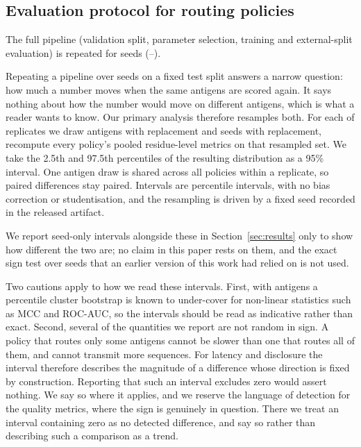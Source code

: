 \subsection{Evaluation protocol for routing policies}
\label{sec:eval-protocol}

The full pipeline (validation split, parameter selection, training and
external-split evaluation) is repeated for \NumSeeds{} seeds
(\SeedFirst{}--\SeedLast{}).

Repeating a pipeline over seeds on a fixed test split answers a narrow
question: how much a number moves when the same antigens are scored again. It
says nothing about how the number would move on different antigens, which is
what a reader wants to know. Our primary analysis therefore resamples both.
For each of \AntigenBootstrapRepeats{} replicates we draw \AntigenCount{}
antigens with replacement and \NumSeeds{} seeds with replacement, recompute
every policy's pooled residue-level metrics on that resampled set. We take
the 2.5th and 97.5th percentiles of the resulting distribution as a 95\%
interval. One antigen draw is shared across all policies within a replicate,
so paired differences stay paired. Intervals are percentile intervals, with no
bias correction or studentisation, and the resampling is driven by a fixed
seed recorded in the released artifact.

We report seed-only intervals alongside these in Section~\ref{sec:results}
only to show how different the two are; no claim in this paper rests on them,
and the exact sign test over seeds that an earlier version of this work had relied
on is not used.

Two cautions apply to how we read these intervals. First, with
\AntigenCount{} antigens a percentile cluster bootstrap is known to
under-cover for non-linear statistics such as MCC and ROC-AUC, so the
intervals should be read as indicative rather than exact. Second, several of
the quantities we report are not random in sign. A policy that routes only
some antigens cannot be slower than one that routes all of them, and cannot
transmit more sequences. For latency and disclosure the interval therefore describes
the magnitude of a difference whose direction is fixed by construction.
Reporting that such an interval excludes zero would assert nothing. We say so
where it applies, and we reserve the language of detection for the quality
metrics, where the sign is genuinely in question. There we treat an interval
containing zero as no detected difference, and say so rather than describing
such a comparison as a trend.

